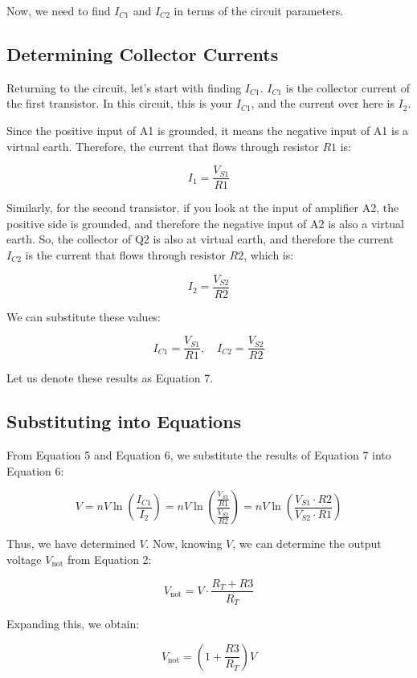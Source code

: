 Now, we need to find \( I_{C1} \) and \( I_{C2} \) in terms of the circuit parameters.

\subsection*{Determining Collector Currents}

Returning to the circuit, let's start with finding \( I_{C1} \). \( I_{C1} \) is the collector current of the first transistor. In this circuit, this is your \( I_{C1} \), and the current over here is \( I_2 \).

Since the positive input of A1 is grounded, it means the negative input of A1 is a virtual earth. Therefore, the current that flows through resistor \( R1 \) is:

\[
I_1 = \frac{V_{S1}}{R1}
\]

Similarly, for the second transistor, if you look at the input of amplifier A2, the positive side is grounded, and therefore the negative input of A2 is also a virtual earth. So, the collector of Q2 is also at virtual earth, and therefore the current \( I_{C2} \) is the current that flows through resistor \( R2 \), which is:

\[
I_2 = \frac{V_{S2}}{R2}
\]

We can substitute these values:

\[
I_{C1} = \frac{V_{S1}}{R1}, \quad I_{C2} = \frac{V_{S2}}{R2}
\]

Let us denote these results as Equation 7.

\subsection*{Substituting into Equations}

From Equation 5 and Equation 6, we substitute the results of Equation 7 into Equation 6:

\[
V = n V \ln\left(\frac{I_{C1}}{I_2}\right) = n V \ln\left(\frac{\frac{V_{S1}}{R1}}{\frac{V_{S2}}{R2}}\right) = n V \ln\left(\frac{V_{S1} \cdot R2}{V_{S2} \cdot R1}\right)
\]

Thus, we have determined \( V \). Now, knowing \( V \), we can determine the output voltage \( V_{\text{not}} \) from Equation 2:

\[
V_{\text{not}} = V \cdot \frac{R_T + R3}{R_T}
\]

Expanding this, we obtain:

\[
V_{\text{not}} = \left(1 + \frac{R3}{R_T}\right) V
\]

